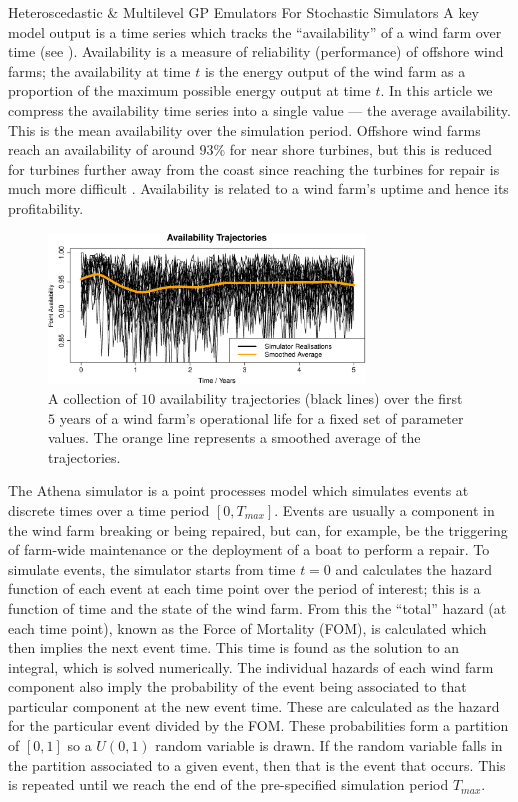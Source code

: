 \begin{chapter}{Heteroscedastic \& Multilevel GP Emulators For Stochastic Simulators\label{Ch:Hetsml}}
A key model output is a time series which tracks the ``availability'' of a wind farm over time (see ). Availability is a measure of reliability (performance) of offshore wind farms; the availability at time $t$ is the energy output of the wind farm as a proportion of the maximum possible energy output at time $t$. In this article we compress the availability time series into a single value --- the average availability. This is the mean availability over the simulation period. Offshore wind farms reach an availability of around $93\%$ for near shore turbines, but this is reduced for turbines further away from the coast since reaching the turbines for repair is much more difficult \citep{Carroll2016}. Availability is related to a wind farm's uptime and hence its profitability.
\begin{figure}[h]
	\centering
	\includegraphics[width = 0.75\textwidth]{sml-het-fig/avail-traj-years.eps}
	\caption{A collection of $10$ availability trajectories (black lines) over the first $5$ years of a wind farm's operational life for a fixed set of parameter values. The orange line represents a smoothed average of the trajectories.}
	\label{Fig:availability-trajectories}
\end{figure}
The Athena simulator is a point processes model which simulates events at discrete times over a time period $[0, T_{max}]$. Events are usually a component in the wind farm breaking or being repaired, but can, for example, be the triggering of farm-wide maintenance or the deployment of a boat to perform a repair. To simulate events, the simulator starts from time $t=0$ and calculates the hazard function of each event at each time point over the period of interest; this is a function of time and the state of the wind farm. From this the ``total'' hazard (at each time point), known as the Force of Mortality (FOM), is calculated which then implies the next event time. This time is found as the solution to an integral, which is solved numerically. The individual hazards of each wind farm component also imply the probability of the event being associated to that particular component at the new event time. These are calculated as the hazard for the particular event divided by the FOM. These probabilities form a partition of $[0,1]$ so a $U(0,1)$ random variable is drawn. If the random variable falls in the partition associated to a given event, then that is the event that occurs. This is repeated until we reach the end of the pre-specified simulation period $T_{max}$.


\end{chapter}
